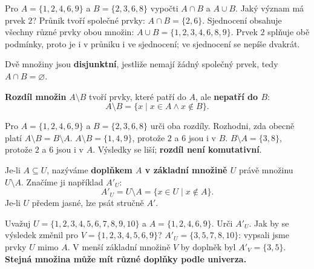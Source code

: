 \documentclass[11pt,a4paper]{article}
\begin{document}
\begin{prikladReseniBox}[title={Příklad 2}]
Pro $A=\{1,2,4,6,9\}$ a $B=\{2,3,6,8\}$ vypočti
$A\cap B$ a $A\cup B$. Jaký význam má prvek $2$?
\tcblower
Průnik tvoří společné prvky:
$A\cap B=\{2,6\}$.
Sjednocení obsahuje všechny různé prvky obou množin:
$A\cup B=\{1,2,3,4,6,8,9\}$.
Prvek $2$ splňuje obě podmínky, proto je i v průniku i ve sjednocení;
ve sjednocení se nepíše dvakrát.
\end{prikladReseniBox}

\begin{definiceBox}[title={Definice - Disjunktní množiny}]
Dvě množiny jsou \textbf{disjunktní}, jestliže nemají žádný
společný prvek, tedy $A\cap B=\varnothing$.
\end{definiceBox}

\begin{definiceBox}[title={Definice - Rozdíl množin}]
\textbf{Rozdíl množin} $A\setminus B$ tvoří prvky, které
patří do $A$, ale \textbf{nepatří do $B$}:
\[
A\setminus B=\{x\mid x\in A\land x\notin B\}.
\]
\end{definiceBox}

\begin{prikladReseniBox}[title={Příklad 3}]
Pro $A=\{1,2,4,6,9\}$ a $B=\{2,3,6,8\}$ urči oba rozdíly.
Rozhodni, zda obecně platí $A\setminus B=B\setminus A$.
\tcblower
$A\setminus B=\{1,4,9\}$, protože $2$ a $6$ jsou i v $B$.
$B\setminus A=\{3,8\}$, protože $2$ a $6$ jsou i v $A$.
Výsledky se liší; \textbf{rozdíl není komutativní}.
\end{prikladReseniBox}

\begin{definiceBox}[title={Definice - Doplněk množiny}]
Je-li $A\subseteq U$, nazýváme \textbf{doplňkem $A$ v základní množině $U$}
právě množinu $U\setminus A$. Značíme ji například $A'_U$:
\[
A'_U=U\setminus A=\{x\in U\mid x\notin A\}.
\]
Je-li $U$ předem jasné, lze psát stručně $A'$.
\end{definiceBox}

\begin{prikladReseniBox}[title={Příklad 4}]
Uvažuj $U=\{1,2,3,4,5,6,7,8,9,10\}$ a
$A=\{1,2,4,6,9\}$. Urči $A'_U$.
Jak by se výsledek změnil pro $V=\{1,2,3,4,5,6,9\}$?
\tcblower
$A'_U=\{3,5,7,8,10\}$: vypsali jsme prvky $U$ mimo $A$.
V menší základní množině $V$ by doplněk byl $A'_V=\{3,5\}$.
\textbf{Stejná množina může mít různé doplňky podle univerza.}
\end{prikladReseniBox}
\end{document}
